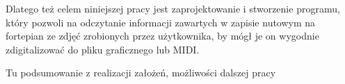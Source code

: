 \documentclass[xodstep]{wnspt}
\begin{document}
Dlatego też celem niniejszej pracy jest zaprojektowanie i stworzenie programu, który pozwoli na odczytanie informacji zawartych w zapisie nutowym na fortepian ze zdjęć zrobionych przez użytkownika, by mógł je on wygodnie zdigitalizować do pliku graficznego lub MIDI.








\summary
Tu podsumowanie z realizacji założeń, możliwości dalszej pracy




\listoftables

\listoffigures

\lstlistoflistings
\end{document}
